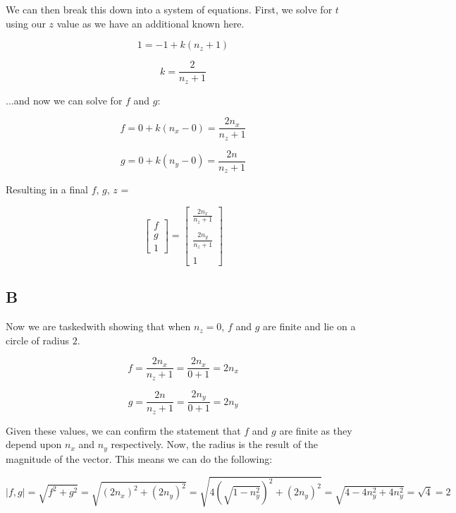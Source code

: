 \documentclass{article}
\begin{document}
\noindent We can then break this down into a system of equations. First, we solve for $t$ using our $z$ value as we have an additional known here.

\begin{equation}
    1 = -1 + k (n_z + 1)
\end{equation}

\begin{equation}
    k = \frac{2}{n_z+1}
\end{equation}

\noindent ...and now we can solve for $f$ and $g$:

\begin{equation}
    f = 0 + k (n_x-0) = \frac{2n_x}{n_z+1}
\end{equation}

\begin{equation}
    g = 0 + k(n_y-0) = \frac{2n}{n_z+1}
\end{equation}

\noindent Resulting in a final $f$, $g$, $z$ = 

\begin{equation}
    \begin{bmatrix}
        f \\ g \\ 1
    \end{bmatrix} = \begin{bmatrix}
        \frac{2n_x}{n_z+1} \\ \\ \frac{2n_y}{n_z+1} \\ \\ 1
    \end{bmatrix}
\end{equation}

\subsection*{B}

Now we are taskedwith showing that when $n_z = 0$, $f$ and $g$ are finite and lie on a circle of radius $2$.

\begin{equation}
    f = \frac{2n_x}{n_z+1} = \frac{2n_x}{0+1} = 2n_x
\end{equation}

\begin{equation}
    g = \frac{2n}{n_z+1} = \frac{2n_y}{0+1} = 2n_y
\end{equation}

\noindent Given these values, we can confirm the statement that $f$ and $g$ are finite as they depend upon $n_x$ and $n_y$ respectively. Now, the radius is the result of the magnitude of the vector. This means we can do the following:

\begin{equation}
    |f,g| = \sqrt{f^2 + g^2} = \sqrt{ (2n_x)^2 + (2n_y)^2 } = \sqrt{4(\sqrt{1-n^2_y})^2 + (2n_y)^2} = \sqrt{4 - 4n_y^2 + 4n_y^2} = \sqrt{4} = 2
\end{equation}
\end{document}

